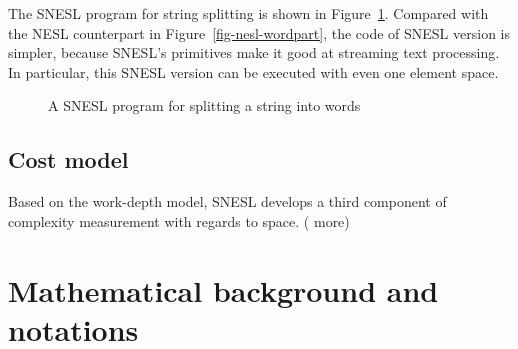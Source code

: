 The SNESL program for string splitting is shown in Figure~\ref{fig-snesl-wordpart}. 
Compared with the NESL counterpart in Figure~\ref{fig-nesl-wordpart}, the code of SNESL version is simpler, because SNESL's primitives make it good at streaming text processing. 
In particular, this SNESL version can be executed with even one element space.
 
\begin{figure}[H]
	 
	\caption{{A SNESL program for splitting a string into words \label{fig-snesl-wordpart}}}
\end{figure}


\subsection{Cost model}
Based on the work-depth model, SNESL develops a third component of complexity measurement with regards to space.
(%
more)

\section{Mathematical background and notations}
%	
%

